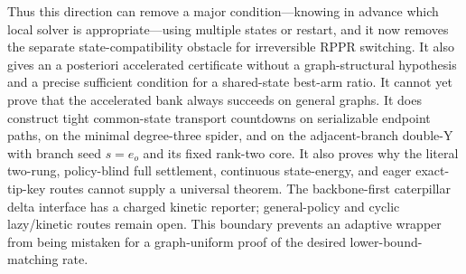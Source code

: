 Thus this direction can remove a major condition---knowing in advance which
local solver is appropriate---using multiple states or restart, and it now
removes the separate state-compatibility obstacle for irreversible RPPR
switching.  It also gives an a posteriori accelerated certificate without a
graph-structural hypothesis and a precise sufficient condition for a
shared-state best-arm ratio.  It cannot yet prove that the accelerated bank
always succeeds on general graphs.  It does construct tight common-state
transport countdowns on serializable endpoint paths, on the minimal
degree-three spider, and on the adjacent-branch double-Y with branch seed
$s=e_o$ and its fixed rank-two core.  It also proves why the literal two-rung,
 policy-blind full settlement, continuous state-energy, and eager exact-tip-key
 routes cannot supply a universal theorem.  The backbone-first caterpillar
 delta interface has a charged kinetic reporter; general-policy and cyclic
 lazy/kinetic routes remain open.  This boundary prevents an adaptive wrapper from being
mistaken for a graph-uniform proof of the desired lower-bound-matching rate.
